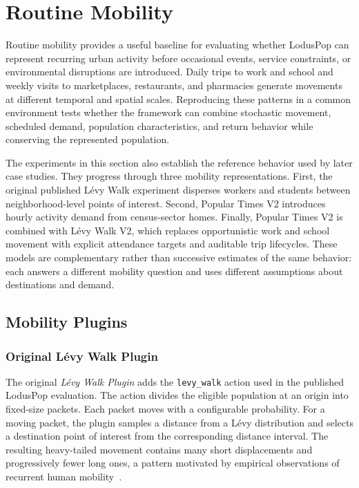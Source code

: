 \section{Routine Mobility}
\label{sec:results_routine_mobility}

Routine mobility provides a useful baseline for evaluating whether LodusPop can represent recurring urban activity before occasional events, service constraints, or environmental disruptions are introduced. Daily trips to work and school and weekly visits to marketplaces, restaurants, and pharmacies generate movements at different temporal and spatial scales. Reproducing these patterns in a common environment tests whether the framework can combine stochastic movement, scheduled demand, population characteristics, and return behavior while conserving the represented population.

The experiments in this section also establish the reference behavior used by later case studies. They progress through three mobility representations. First, the original published L\'evy Walk experiment disperses workers and students between neighborhood-level points of interest. Second, Popular Times V2 introduces hourly activity demand from census-sector homes. Finally, Popular Times V2 is combined with L\'evy Walk V2, which replaces opportunistic work and school movement with explicit attendance targets and auditable trip lifecycles. These models are complementary rather than successive estimates of the same behavior: each answers a different mobility question and uses different assumptions about destinations and demand.

\subsection{Mobility Plugins}
\label{sec:routine_mobility_plugins}

\subsubsection{Original L\'evy Walk Plugin}

The original \textit{L\'evy Walk Plugin} adds the \texttt{levy\_walk} action used in the published LodusPop evaluation. The action divides the eligible population at an origin into fixed-size packets. Each packet moves with a configurable probability. For a moving packet, the plugin samples a distance from a L\'evy distribution and selects a destination point of interest from the corresponding distance interval. The resulting heavy-tailed movement contains many short displacements and progressively fewer long ones, a pattern motivated by empirical observations of recurrent human mobility~\citep{gonzalez2008understanding}.

